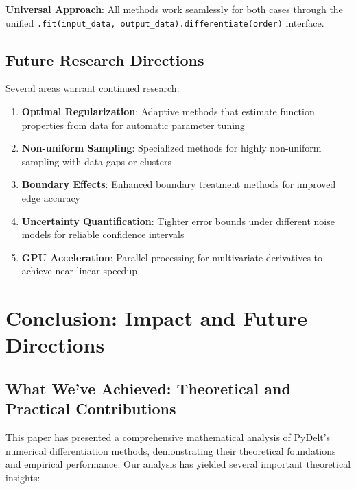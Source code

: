 \documentclass[10pt,journal,compsoc]{IEEEtran}
\begin{document}
\textbf{Universal Approach}: All methods work seamlessly for both cases through the unified \texttt{.fit(input\_data, output\_data).differentiate(order)} interface.

\subsection{Future Research Directions}

Several areas warrant continued research:

\begin{enumerate}
    \item \textbf{Optimal Regularization}: Adaptive methods that estimate function properties from data for automatic parameter tuning
    
    \item \textbf{Non-uniform Sampling}: Specialized methods for highly non-uniform sampling with data gaps or clusters
    
    \item \textbf{Boundary Effects}: Enhanced boundary treatment methods for improved edge accuracy
    
    \item \textbf{Uncertainty Quantification}: Tighter error bounds under different noise models for reliable confidence intervals
    
    \item \textbf{GPU Acceleration}: Parallel processing for multivariate derivatives to achieve near-linear speedup
\end{enumerate}

\section{Conclusion: Impact and Future Directions}

\subsection{What We've Achieved: Theoretical and Practical Contributions}

This paper has presented a comprehensive mathematical analysis of PyDelt's numerical differentiation methods, demonstrating their theoretical foundations and empirical performance. Our analysis has yielded several important theoretical insights:
\end{document}
